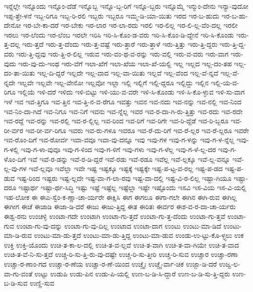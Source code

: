 {ಇನ್ನೆಲ್ಲೇ
ಇನ್ನೊಂದು
ಇನ್ನೊಂ-ದೆಡೆ
ಇನ್ನೊಬ್ಬ
ಇನ್ನೊ-ಬ್ಬ-ರಿಗೆ
ಇನ್ನೊ-ಬ್ಬರು
ಇನ್ನೊಮ್ಮೆ
ಇನ್ಮುಂ-ದೇನು
ಇನ್ಯಾ-ವುದೋ
ಇಪ್ಪ-ತ್ತೇ-ಳನೆ
ಇಬ್ಬ-ರಿಗೂ
ಇಬ್ಬ-ರಿ-ರಲಿ
ಇಬ್ಬರು
ಇಬ್ಬರೂ
ಇಮ್ಮ-ಡಿ-ಯಾ-ಯಿತು
ಇರದ
ಇರ-ಬ-ಹುದು
ಇರ-ಬ-ಹು-ದೇನೋ
ಇರ-ಬೇ-ಕಾ-ದರೆ
ಇರ-ಬೇಕು
ಇರ-ಲಾರ
ಇರ-ಲಾ-ರದು
ಇರಲಿ
ಇರ-ಲಿಲ್ಲ
ಇರ-ಲಿ-ಲ್ಲ-ವೆಂ-ದಲ್ಲ
ಇರಲೀ
ಇರಲು
ಇರ-ಲೆಂದು
ಇರ-ಲೆಂಬ
ಇರಲೇ
ಇರಿಸಿ
ಇರಿ-ಸಿ-ಕೊಂ-ಡ-ವರು
ಇರಿ-ಸಿ-ಕೊಂ-ಡಿ-ದ್ದೇನೆ
ಇರಿ-ಸಿ-ಕೊಂಡು
ಇರು-ತ್ತ-ದಲ್ಲ
ಇರು-ತ್ತದೆ
ಇರು-ತ್ತ-ದೆಂದು
ಇರು-ತ್ತ-ವಷ್ಟೆ
ಇರು-ತ್ತಾರೆ
ಇರು-ತ್ತಾಳೆ
ಇರು-ತ್ತಿತ್ತು
ಇರು-ತ್ತಿ-ದ್ದರು
ಇರು-ತ್ತಿ-ದ್ದ-ವರು
ಇರು-ತ್ತಿ-ದ್ದವು
ಇರು-ತ್ತಿ-ರ-ಲಿಲ್ಲ
ಇರುವ
ಇರು-ವಂ-ಥ-ವ-ರನ್ನು
ಇರು-ವಲ್ಲಿ
ಇರು-ವ-ವರು
ಇರು-ವಾಗ
ಇರು-ವುದು
ಇರು-ವು-ದು-ಇಂಥ
ಇರು-ವೆಗೆ
ಇಲಾ-ಖೆಗೆ
ಇಲಾ-ಖೆಯ
ಇಲಾ-ಖೆ-ಯಲ್ಲಿ
ಇಲ್ಲ
ಇಲ್ಲದ
ಇಲ್ಲ-ದಂ-ತಹ
ಇಲ್ಲ-ದಂ-ತಾ-ಯಿತು
ಇಲ್ಲ-ದಿ-ದ್ದರೆ
ಇಲ್ಲದೇ
ಇಲ್ಲ-ವಾದ
ಇಲ್ಲ-ವಾ-ಯಿತು
ಇಲ್ಲವೆ
ಇಲ್ಲ-ವೆಂದ
ಇಲ್ಲ-ವೆ-ನ್ನದೆ
ಇಲ್ಲ-ವೆ-ನ್ನದೇ
ಇಲ್ಲವೇ
ಇಲ್ಲವೇ
ಇಲ್ಲ-ವೇನೋ
ಇಲ್ಲವೋ
ಇಲ್ಲಾ
ಇಲ್ಲಿ
ಇಲ್ಲಿಗೆ
ಇಲ್ಲಿ-ದ್ದರೂ
ಇಲ್ಲಿದ್ದು
ಇಲ್ಲಿನ
ಇಲ್ಲಿ-ಯ-ವ-ರಿಗೂ
ಇಲ್ಲಿಯೆ
ಇಳಿ-ದರೆ
ಇಳಿದು
ಇಳಿ-ಬಿಟ್ಟು
ಇಳಿ-ಯು-ವ-ವರೇ
ಇಳಿ-ಸಿ-ಕೊಂಡು
ಇಳಿ-ಸಿ-ಕೊ-ಳ್ಳುವ
ಇಳಿ-ಸು-ವಾಗ
ಇಳೆ
ಇವ
ಇವ-ತ್ತಿಗೂ
ಇವ-ತ್ತಿನ
ಇವ-ತ್ತಿ-ನ-ವ-ರೆಗೂ
ಇವತ್ತು
ಇವನ
ಇವ-ನದು
ಇವ-ನನ್ನು
ಇವ-ನಲ್ಲಿ
ಇವ-ನಿಂದ
ಇವ-ನಿಂ-ದಾ-ಗಿದೆ
ಇವ-ನಿಗೂ
ಇವ-ನಿಗೆ
ಇವನು
ಇವ-ನ್ನೆಲ್ಲ
ಇವರ
ಇವ-ರ-ದಾ-ಗಿ-ರು-ತ್ತಿತ್ತು
ಇವ-ರದು
ಇವ-ರದೇ
ಇವ-ರದ್ದೆ
ಇವ-ರನ್ನು
ಇವ-ರಲ್ಲಿ
ಇವ-ರ-ಲ್ಲಿಲ್ಲ
ಇವ-ರಿಂದ
ಇವ-ರಿಗೆ
ಇವ-ರಿಗೇ
ಇವ-ರಿ-ದ್ದೆಡೆ
ಇವ-ರಿ-ಬ್ಬರೂ
ಇವ-ರೀ-ರ್ವರ
ಇವ-ರೀ-ರ್ವ-ರಿಗೂ
ಇವರು
ಇವ-ರು-ಗಳೂ
ಇವರೂ
ಇವ-ರೆ-ದು-ರಿಗೆ
ಇವ-ರೆ-ಲ್ಲರ
ಇವ-ರೆ-ಲ್ಲರೂ
ಇವರೇ
ಇವ-ರೊಂ-ದಿಗೆ
ಇವ-ರೋರ್ವ
ಇವಾ-ವವೂ
ಇವಾ-ವು-ದನ್ನೂ
ಇವು
ಇವು-ಗಳ
ಇವು-ಗ-ಳನ್ನು
ಇವು-ಗ-ಳ-ನ್ನೆಲ್ಲ
ಇವು-ಗ-ಳಲ್ಲಿ
ಇವು-ಗ-ಳಾ-ವುವೂ
ಇವು-ಗ-ಳಿಂದ
ಇವು-ಗ-ಳಿಗೆ
ಇವು-ಗಳು
ಇವು-ಗ-ಳೆಲ್ಲ
ಇವು-ಗ-ಳೆ-ಲ್ಲ-ದರ
ಇವು-ಗ-ಳೊಂ-ದಿಗೆ
ಇವೆ
ಇವೆ-ರ-ಡನ್ನು
ಇವೆ-ರ-ಡಿ-ದ್ದರೆ
ಇವೆ-ರಡು
ಇವೆ-ರಡೂ
ಇವೆಲ್ಲ
ಇವೆ-ಲ್ಲಕ್ಕೂ
ಇವೆ-ಲ್ಲ-ವನ್ನೂ
ಇವೆ-ಲ್ಲ-ವು-ಗಳ
ಇವೆ-ಲ್ಲವೂ
ಇವೆಲ್ಲಾ
ಇವೇ
ಇಷ್ಟ
ಇಷ್ಟಕ್ಕೂ
ಇಷ್ಟಕ್ಕೆ
ಇಷ್ಟಕ್ಕೇ
ಇಷ್ಟ-ಪ-ಟ್ಟ-ವ-ರಲ್ಲ
ಇಷ್ಟ-ಪ-ಡದ
ಇಷ್ಟ-ಪ-ಡುವ
ಇಷ್ಟ-ರಿಂದ
ಇಷ್ಟರು
ಇಷ್ಟ-ಲ್ಲದೇ
ಇಷ್ಟ-ವಾ-ಗ-ಲಾ-ರವು
ಇಷ್ಟ-ವಾ-ದಲ್ಲಿ
ಇಷ್ಟ-ವಿ-ರ-ಲಿಲ್ಲ
ಇಷ್ಟಾ-ಗಿಯೂ
ಇಷ್ಟಾ-ದರೂ
ಇಷ್ಟಾರ್ಥ
ಇಷ್ಟಾ-ರ್ಥ-ಸಿದ್ಧಿ
ಇಷ್ಟು
ಇಷ್ಟೆ
ಇಷ್ಟೆಲ್ಲ
ಇಷ್ಟೆಲ್ಲಾ
ಇಷ್ಟೇ
ಇಷ್ಟೊಂದು
ಇಸವಿ
ಇಸ-ವಿಯ
ಇಸ-ವಿ-ಯಲ್ಲಿ
ಇಹ-ಲೋಕ
ಈ
ಈಎ-ಸ್ವೆಂ-ಕ-ಣ್ಣಾ-ಚಾ-ರ್ಯರೇ
ಈಕ್ಷಿಸಿ
ಈಗ
ಈಗಲೂ
ಈಗಾ-ಗಲೇ
ಈಗಿನ
ಈಗಿ-ರುವ
ಈಗಿಲ್ಲ
ಈಗೀಗ
ಈಚೆ
ಈಜಾಡಿ
ಈಜಾ-ಡಿ-ದರೆ
ಈಜು
ಈಜು-ತ್ತಿದ್ದ
ಈತ
ಈರಿತಃ
ಈರ್ವರ
ಈಶ-ವ-ರ-ದಾ-ಚಾ-ರ್ಯರು
ಈಶ್ವ-ರನು
ಉಂಚಳ್ಳಿ
ಉಂಟಾ-ಗದೇ
ಉಂಟಾಗಿ
ಉಂಟಾ-ಗು-ತ್ತದೆ
ಉಂಟಾ-ಗು-ತ್ತ-ದೆಂದು
ಉಂಟಾ-ಗು-ತ್ತವೆ
ಉಂಟಾ-ಗುವ
ಉಂಟಾ-ಗು-ವು-ದನ್ನು
ಉಂಟಾ-ಗು-ವು-ದಿಲ್ಲ
ಉಂಟಾದ
ಉಂಟಾ-ದಾಗ
ಉಂಟು
ಉಂಟು-ಮಾ-ಡಿದೆ
ಉಂಟು-ಮಾ-ಡಿ-ರುವ
ಉಂಟು-ಮಾ-ಡು-ತ್ತದೆ
ಉಂಟು-ಮಾ-ಡು-ತ್ತಿದ್ದ
ಉಂಟು-ಮಾ-ಡುವ
ಉಂಡು-ಉ-ಟ್ಟು-ಕೊ-ಳ್ಳ್ಳಲು
ಉಕ
ಉಕ್ತಿ
ಉಕ್ತಿ-ಯೊಂದು
ಉಚಿ-ತ-ಕಾ-ಲ-ದಲ್ಲಿ
ಉಚಿ-ತ-ವ-ಲ್ಲವೆ
ಉಚಿ-ತ-ವಾಗಿ
ಉಚಿ-ತ-ವಾ-ಗಿಯೇ
ಉಚಿ-ತ-ವಾದ
ಉಚಿ-ತ-ವೆ-ನಿ-ಸು-ತ್ತದೆ
ಉಚ್ಚ-ರಿ-ಸು-ತ್ತಿ-ರು-ವು-ದಷ್ಟೇ
ಉಚ್ಚ-ರಿ-ಸು-ತ್ತೀರಿ
ಉಚ್ಚ-ರಿ-ಸುವ
ಉಚ್ಚಾರ
ಉಚ್ಚಾ-ರಣಾ
ಉಚ್ಚಾ-ರ-ಣಾಂ-ಗದ
ಉಚ್ಚಾ-ರ-ಣೆಯ
ಉಚ್ಚಾ-ರ-ಣೆ-ಯಿಂದ
ಉಚ್ಚೈಃ
ಉಚ್ಚೈ-ರ್ವಾ-ಚಿಕ
ಉಜ್ಜಾ-ಡಿ-ದರೆ
ಉಜ್ವ-ಲ-ವಾ-ಗು-ವಂತೆ
ಉಟ್ಟು
ಉಡುಪಿ
ಉಡು-ಪಿನ
ಉಡು-ಪಿ-ಯಲ್ಲಿ
ಉಣ-ಬ-ಡಿ-ಸಿ-ದ್ದಾರೆ
ಉಣ-ಬ-ಡಿ-ಸು-ತ್ತಿ-ದ್ದರು
ಉಣ-ಬ-ಡಿ-ಸುವ
ಉಣ್ಣಿ-ಸುವ
}
